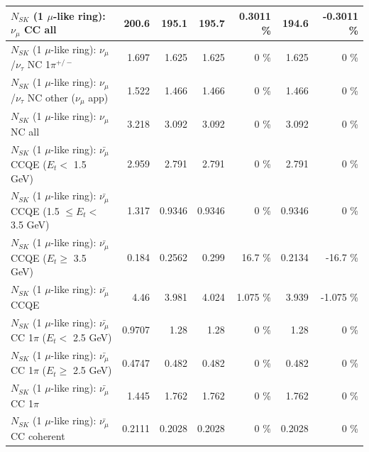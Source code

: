 \begin{table}
\begin{tabular}{| l | r | r | r  r | r  r |}
                                $N_{SK}$ (1 $\mu$-like ring): $\nu_{\mu}$ CC all &           200.6 &           195.1 &           195.7 &   0.3011 \%  &           194.6 &  -0.3011 \%  \\ 
\hline
              $N_{SK}$ (1 $\mu$-like ring): $\nu_\mu$/$\nu_\tau$ NC 1$\pi^{+/-}$ &           1.697 &           1.625 &           1.625 &        0 \%  &           1.625 &        0 \%  \\ 
     $N_{SK}$ (1 $\mu$-like ring): $\nu_\mu$/$\nu_\tau$ NC other ($\nu_\mu$ app) &           1.522 &           1.466 &           1.466 &        0 \%  &           1.466 &        0 \%  \\ 
                                $N_{SK}$ (1 $\mu$-like ring): $\nu_{\mu}$ NC all &           3.218 &           3.092 &           3.092 &        0 \%  &           3.092 &        0 \%  \\ 
\hline
\hline
\hline
          $N_{SK}$ (1 $\mu$-like ring): $\bar{\nu_\mu}$ CCQE ($E_{t} <$ 1.5 GeV) &           2.959 &           2.791 &           2.791 &        0 \%  &           2.791 &        0 \%  \\ 
 $N_{SK}$ (1 $\mu$-like ring): $\bar{\nu_\mu}$ CCQE (1.5 $\leq E_{t} <$ 3.5 GeV) &           1.317 &          0.9346 &          0.9346 &        0 \%  &          0.9346 &        0 \%  \\ 
       $N_{SK}$ (1 $\mu$-like ring): $\bar{\nu_\mu}$ CCQE ($E_{t} \geq$ 3.5 GeV) &           0.184 &          0.2562 &           0.299 &     16.7 \%  &          0.2134 &    -16.7 \%  \\ 
\hline
                              $N_{SK}$ (1 $\mu$-like ring): $\bar{\nu_\mu}$ CCQE &            4.46 &           3.981 &           4.024 &    1.075 \%  &           3.939 &   -1.075 \%  \\ 
\hline
     $N_{SK}$ (1 $\mu$-like ring): $\bar{\nu_\mu}$ CC 1$\pi$ ($E_{t} <$ 2.5 GeV) &          0.9707 &            1.28 &            1.28 &        0 \%  &            1.28 &        0 \%  \\ 
  $N_{SK}$ (1 $\mu$-like ring): $\bar{\nu_\mu}$ CC 1$\pi$ ($E_{t} \geq$ 2.5 GeV) &          0.4747 &           0.482 &           0.482 &        0 \%  &           0.482 &        0 \%  \\ 
\hline
                         $N_{SK}$ (1 $\mu$-like ring): $\bar{\nu_\mu}$ CC 1$\pi$ &           1.445 &           1.762 &           1.762 &        0 \%  &           1.762 &        0 \%  \\ 
                       $N_{SK}$ (1 $\mu$-like ring): $\bar{\nu_\mu}$ CC coherent &          0.2111 &          0.2028 &          0.2028 &        0 \%  &          0.2028 &        0 \%  \\ 

\end{tabular}
\end{table}

